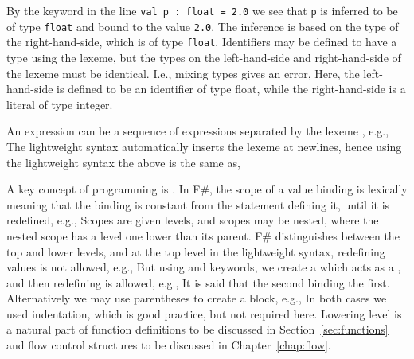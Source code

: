 %
%
By the  keyword in the line \lstinline!val p : float = 2.0! we see that \lstinline!p! is inferred to be of type \lstinline!float! and bound to the value \lstinline!2.0!. The inference is based on the type of the right-hand-side, which is of type \lstinline!float!.  Identifiers may be defined to have a type using the \lexeme{:} lexeme, but the types on the left-hand-side and right-hand-side of the \lexeme{=} lexeme must be identical. I.e., mixing types gives an error,
%
%
%
Here, the left-hand-side is defined to be an identifier of type float, while the right-hand-side is a literal of type integer.

An expression can be a sequence of expressions separated by the lexeme \lexeme{;}, e.g.,
%
%
The lightweight syntax automatically inserts the \lexeme{;} lexeme at newlines, hence using the lightweight syntax the above is the same as,
%
%

A key concept of programming is . In F\#, the scope of a value binding is lexically meaning that the binding is constant from the  statement defining it, until it is redefined, e.g.,
%
%
Scopes are given levels, and scopes may be nested, where the nested scope has a level one lower than its parent. F\# distinguishes between the top and lower levels, and at the top level in the lightweight syntax, redefining values is not allowed, e.g.,
%
%
But using  and  keywords, we create a  which acts as a , and then redefining is allowed, e.g.,
%
%
It is said that the second binding  the first.
Alternatively we may use parentheses to create a block, e.g.,
%
%
In both cases we used indentation, which is good practice, but not required here.  Lowering level is a natural part of function definitions to be discussed in Section~\ref{sec:functions} and flow control structures to be discussed in Chapter~\ref{chap:flow}.

